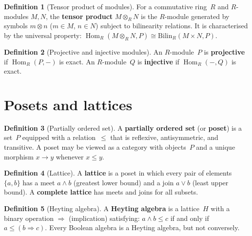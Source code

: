 \documentclass[a4paper,12pt]{book}
\DeclareMathOperator{\Hom}{Hom}
\theoremstyle{definition}
\newtheorem{definition}{Definition}[section]
\theoremstyle{plain}
\theoremstyle{remark}
\begin{document}
\begin{definition}[Tensor product of modules]\label{def:app-tensor}
For a commutative ring~$R$ and $R$-modules $M,N$, the \textbf{tensor
product} $M\otimes_R N$ is the $R$-module generated by symbols
$m\otimes n$ ($m\in M$, $n\in N$) subject to bilinearity relations.
It is characterised by the universal property:
$\Hom_R(M\otimes_R N, P) \cong \mathrm{Bilin}_R(M\times N, P)$.
\end{definition}

\begin{definition}[Projective and injective modules]\label{def:app-proj-inj}
An $R$-module~$P$ is \textbf{projective} if $\Hom_R(P,-)$ is exact.
An $R$-module~$Q$ is \textbf{injective} if $\Hom_R(-,Q)$ is exact.
\end{definition}


\section{Posets and lattices}\label{sec:app-posets}

\begin{definition}[Partially ordered set]\label{def:app-poset}
A \textbf{partially ordered set} (or \textbf{poset}) is a set~$P$
equipped with a relation~$\le$ that is reflexive, antisymmetric, and
transitive.  A poset may be viewed as a category with objects~$P$
and a unique morphism $x\to y$ whenever $x\le y$.
\end{definition}

\begin{definition}[Lattice]\label{def:app-lattice}
A \textbf{lattice} is a poset in which every pair of elements $\{a,b\}$
has a meet $a\wedge b$ (greatest lower bound) and a join $a\vee b$
(least upper bound).  A \textbf{complete lattice} has meets and joins
for all subsets.
\end{definition}

\begin{definition}[Heyting algebra]\label{def:app-heyting}
A \textbf{Heyting algebra} is a lattice~$H$ with a binary operation
$\Rightarrow$ (implication) satisfying: $a\wedge b\le c$ if and only
if $a\le (b\Rightarrow c)$.  Every Boolean algebra is a Heyting algebra,
but not conversely.
\end{definition}
\end{document}
